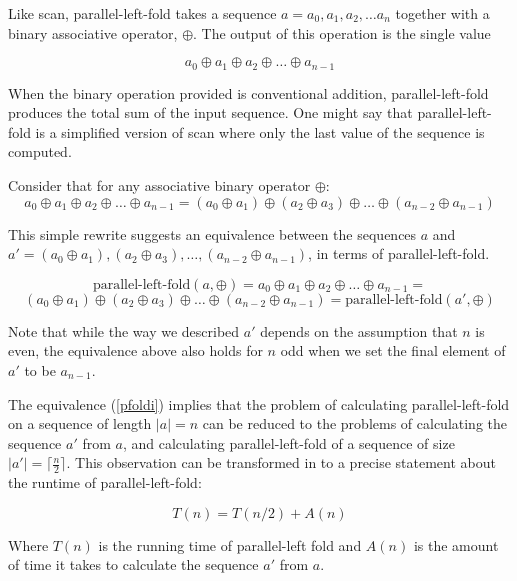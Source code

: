 \documentclass[12pt,twoside]{reedthesis}
\begin{document}
Like scan, parallel-left-fold takes a sequence $a = a_0, a_1, a_2, \ldots a_n$ together with a binary associative operator, $\oplus$. The output of this operation is the single value

$$a_0 \oplus a_1 \oplus a_2 \oplus \ldots \oplus a_{n-1}$$

When the binary operation provided is conventional addition, parallel-left-fold produces the total sum of the input sequence. One might say that parallel-left-fold is a simplified version of scan where only the last value of the sequence is computed.
\vspace{.5pc}

Consider that for any associative binary operator $\oplus$:
\begin{equation}
a_0 \oplus a_1 \oplus a_2 \oplus \ldots \oplus a_{n-1} = (a_0 \oplus a_1) \oplus (a_2 \oplus a_3) \oplus \ldots \oplus (a_{n-2} \oplus a_{n-1}) \label{assocident}
\end{equation}

This simple rewrite suggests an equivalence between the sequences $a$ and $a' = (a_0 \oplus a_1), (a_2 \oplus a_3), \ldots, (a_{n-2} \oplus a_{n-1})$, in terms of parallel-left-fold.

$$
\mbox{parallel-left-fold}(a, \oplus) = 
a_0 \oplus a_1 \oplus a_2 \oplus \ldots \oplus a_{n-1} =
$$
\begin{equation}
(a_0 \oplus a_1) \oplus (a_2 \oplus a_3) \oplus \ldots \oplus (a_{n-2} \oplus a_{n-1}) = 
\mbox{parallel-left-fold}(a', \oplus)
\label{pfoldi}
\end{equation}

Note that while the way we described $a'$ depends on the assumption that $n$ is even, the equivalence above also holds for $n$ odd when we set the final element of $a'$ to be $a_{n-1}$.
\vspace{1pc}

The equivalence (\ref{pfoldi}) implies that the problem of calculating parallel-left-fold on a sequence of length $|a| = n$ can be reduced to the problems of calculating the sequence $a'$ from $a$, and calculating parallel-left-fold of a sequence of size $|a'| = \lceil \frac{n}{2} \rceil$. This observation can be transformed in to a precise statement about the runtime of parallel-left-fold:

\begin{equation}
T(n) = T(n/2) + A(n) 
\label{rr}
\end{equation}

Where $T(n)$ is the running time of parallel-left fold and $A(n)$ is
the amount of time it takes to calculate the sequence $a'$ from $a$. 
\end{document}
